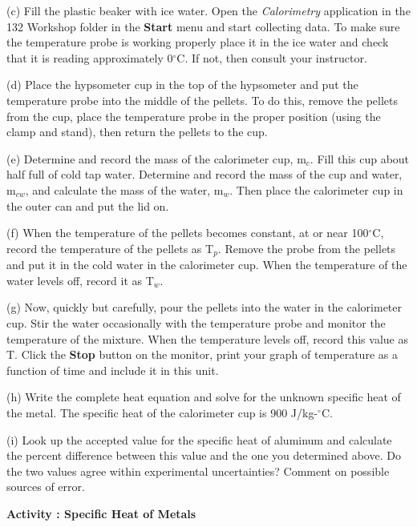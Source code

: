 (c) Fill the plastic beaker with ice water. Open the \textit{Calorimetry}
application in the 132 Workshop folder in the {\bf Start} menu and start
collecting data. To make sure the temperature probe is working 
properly place it in the ice water and
check that it is reading approximately 0\( ^{\circ } \)C. If not,
then consult your instructor.

(d) Place the hypsometer cup in the top of the hypsometer and put the 
temperature probe into the middle of the pellets.  
To do this, remove the pellets from the cup, place the temperature probe in 
the proper position (using the clamp and stand), then return the pellets to the cup.

(e) Determine and record the mass of the calorimeter cup, m\( _{c} \).
Fill this cup about half full of cold tap water. Determine and record
the mass of the cup and water, m\( _{cw} \), and calculate the mass
of the water, m\( _{w} \). Then place the calorimeter cup in the outer
can and put the lid on.
\vspace{15mm}

(f) When the temperature of the pellets becomes constant, at or near
100\( ^{\circ } \)C, record the temperature of the pellets as T\( _{p} \).
Remove the probe from the pellets and put it in the cold water in the calorimeter cup. 
When the temperature of the water levels off, record it as T\( _{w} \).
\vspace{15mm}

(g) Now, quickly but carefully, pour the pellets into the water in
the calorimeter cup. Stir the water occasionally with the temperature probe and
monitor the temperature of the mixture. When the temperature levels off, record
this value as T. Click the {\bf Stop} button on the monitor, 
print your graph of temperature as a function of time and include it in this unit.
\vspace{15mm}

(h) Write the complete heat equation and solve for the unknown specific
heat of the metal. 
The specific heat of the calorimeter cup is 900 J/kg-\( ^{\circ } \)C.
\vspace{2in}

(i) Look up the accepted value for the specific heat of aluminum and
calculate the percent difference between this value and the one you
determined above. Do the two values agree within experimental uncertainties?
Comment on possible sources of error.
\vspace{20mm}

\textbf{Activity : Specific Heat of Metals}

